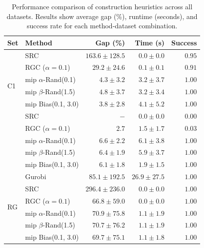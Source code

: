 \documentclass[twocolumn, switch]{article} %
\begin{document}
\begin{table}[h]
    \caption{Performance comparison of construction heuristics across all datasets. Results show average gap (\%), runtime (seconds), and success rate for each method-dataset combination.}
    \label{tab:construction_comparison}
    \centering
    \setlength{\tabcolsep}{2.1pt}
    \begin{tabular}{llrrr}
        \toprule
        \textbf{Set} & \textbf{Method} & \textbf{Gap (\%)} & \textbf{Time (s)} & \textbf{Success} \\
        \midrule
        \multirow[c]{6}{*}{C1} & SRC & $163.6 \pm 128.5$ & $0.0 \pm 0.0$ & $0.95$ \\
        & RGC ($\alpha = 0.1$) & $29.2 \pm 24.6$ & $0.1 \pm 0.1$ & $0.91$ \\
        & \gls{mip} $\alpha$-Rand(0.1) & $4.3 \pm 3.2$ & $3.2 \pm 3.7$ & $1.00$ \\
        & \gls{mip} $\beta$-Rand(1.5) & $4.8 \pm 3.7$ & $3.2 \pm 3.4$ & $1.00$ \\
        & \gls{mip} Bias(0.1, 3.0) & $\mathbf{3.8 \pm 2.8}$ & $4.1 \pm 5.2$ & $1.00$ \\
        \midrule
        \multirow[c]{6}{*}{C2} & SRC & $-$ & $0.0 \pm 0.0$ & $0.00$ \\
        & RGC ($\alpha = 0.1$) & $2.7$ & $1.5 \pm 1.7$ & $0.03$ \\
        & \gls{mip} $\alpha$-Rand(0.1) & $6.6 \pm 2.2$ & $6.1 \pm 3.8$ & $1.00$ \\
        & \gls{mip} $\beta$-Rand(1.5) & $6.4 \pm 1.9$ & $5.9 \pm 3.7$ & $1.00$ \\
        & \gls{mip} Bias(0.1, 3.0) & $\mathbf{6.1 \pm 1.8}$ & $1.9 \pm 1.5$ & $1.00$ \\
        \midrule
        \multirow[c]{6}{*}{RG} & Gurobi & $85.1 \pm 192.5$ & $26.9 \pm 27.5$ & $1.00$ \\
        & SRC & $296.4 \pm 236.0$ & $0.0 \pm 0.0$ & $1.00$ \\
        & RGC ($\alpha = 0.1$) & $66.8 \pm 59.0$ & $0.0 \pm 0.0$ & $1.00$ \\
        & \gls{mip} $\alpha$-Rand(0.1) & $70.9 \pm 75.8$ & $1.1 \pm 1.9$ & $1.00$ \\
        & \gls{mip} $\beta$-Rand(1.5) & $70.7 \pm 76.2$ & $1.1 \pm 1.9$ & $1.00$ \\
        & \gls{mip} Bias(0.1, 3.0) & $\mathbf{69.7 \pm 75.1}$ & $1.1 \pm 1.8$ & $1.00$ \\
        \bottomrule
    \end{tabular}
\end{table}
\end{document}
